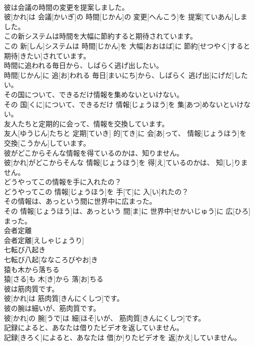 \documentclass[8pt]{extreport}
\begin{document}
\begin{CJK}{UTF8}{min}
\\	彼は会議の時間の変更を提案しました。	
\\	彼[かれ]は 会議[かいぎ]の 時間[じかん]の 変更[へんこう]を 提案[ていあん]しました。	
\\	この新システムは時間を大幅に節約すると期待されています。	
\\	この 新[しん]システムは 時間[じかん]を 大幅[おおはば]に 節約[せつやく]すると 期待[きたい]されています。	
\\	時間に追われる毎日から、しばらく逃げ出したい。	
\\	時間[じかん]に 追[お]われる 毎日[まいにち]から、しばらく 逃げ出[にげだ]したい。	
\\	その国について、できるだけ情報を集めないといけない。	
\\	その 国[くに]について、できるだけ 情報[じょうほう]を 集[あつ]めないといけない。	
\\	友人たちと定期的に会って、情報を交換しています。	
\\	友人[ゆうじん]たちと 定期[ていき] 的[てき]に 会[あ]って、 情報[じょうほう]を 交換[こうかん]しています。	
\\	彼がどこからそんな情報を得ているのかは、知りません。	
\\	彼[かれ]がどこからそんな 情報[じょうほう]を 得[え]ているのかは、 知[し]りません。	
\\	どうやってこの情報を手に入れたの？	
\\	どうやってこの 情報[じょうほう]を 手[て]に 入[い]れたの？	
\\	その情報は、あっという間に世界中に広まった。	
\\	その 情報[じょうほう]は、あっという 間[ま]に 世界中[せかいじゅう]に 広[ひろ]まった。	
\\	会者定離	
\\	会者定離[えしゃじょうり]	
\\	七転び八起き	
\\	七転び八起[ななころびやお]き	
\\	猿も木から落ちる	
\\	猿[さる]も 木[き]から 落[お]ちる	
\\	彼は筋肉質です。	
\\	彼[かれ]は 筋肉質[きんにくしつ]です。	
\\	彼の腕は細いが、筋肉質です。	
\\	彼[かれ]の 腕[うで]は 細[ほそ]いが、 筋肉質[きんにくしつ]です。	
\\	記録によると、あなたは借りたビデオを返していません。	
\\	記録[きろく]によると、あなたは 借[か]りたビデオを 返[かえ]していません。	

\end{CJK}
\end{document}

